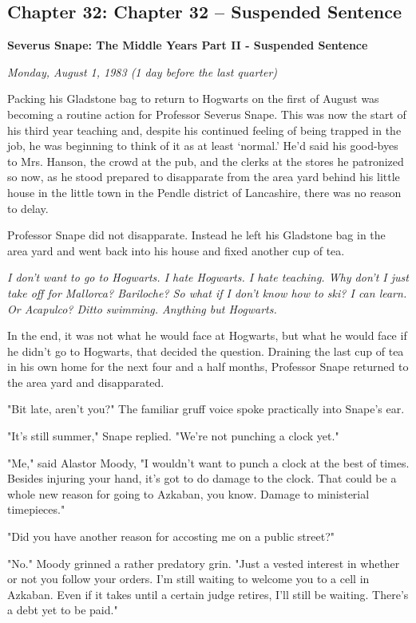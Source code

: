 \documentclass[a4paper,11pt]{article}
\begin{document}
\subsection{Chapter 32: Chapter 32 – Suspended Sentence}

\textbf{Severus Snape: The Middle Years Part II - Suspended Sentence}

\emph{Monday, August 1, 1983 (1 day before the last quarter)}

Packing his Gladstone bag to return to Hogwarts on the first of August was becoming a routine action for Professor Severus Snape. This was now the start of his third year teaching and, despite his continued feeling of being trapped in the job, he was beginning to think of it as at least `normal.' He'd said his good-byes to Mrs. Hanson, the crowd at the pub, and the clerks at the stores he patronized so now, as he stood prepared to disapparate from the area yard behind his little house in the little town in the Pendle district of Lancashire, there was no reason to delay.

Professor Snape did not disapparate. Instead he left his Gladstone bag in the area yard and went back into his house and fixed another cup of tea.

\emph{I don't want to go to Hogwarts. I hate Hogwarts. I hate teaching. Why don't I just take off for Mallorca? Bariloche? So what if I don't know how to ski? I can learn. Or Acapulco? Ditto swimming. Anything but Hogwarts.}

In the end, it was not what he would face at Hogwarts, but what he would face if he didn't go to Hogwarts, that decided the question. Draining the last cup of tea in his own home for the next four and a half months, Professor Snape returned to the area yard and disapparated.

"Bit late, aren't you?" The familiar gruff voice spoke practically into Snape's ear.

"It's still summer," Snape replied. "We're not punching a clock yet."

"Me," said Alastor Moody, "I wouldn't want to punch a clock at the best of times. Besides injuring your hand, it's got to do damage to the clock. That could be a whole new reason for going to Azkaban, you know. Damage to ministerial timepieces."

"Did you have another reason for accosting me on a public street?"

"No." Moody grinned a rather predatory grin. "Just a vested interest in whether or not you follow your orders. I'm still waiting to welcome you to a cell in Azkaban. Even if it takes until a certain judge retires, I'll still be waiting. There's a debt yet to be paid."
\end{document}
